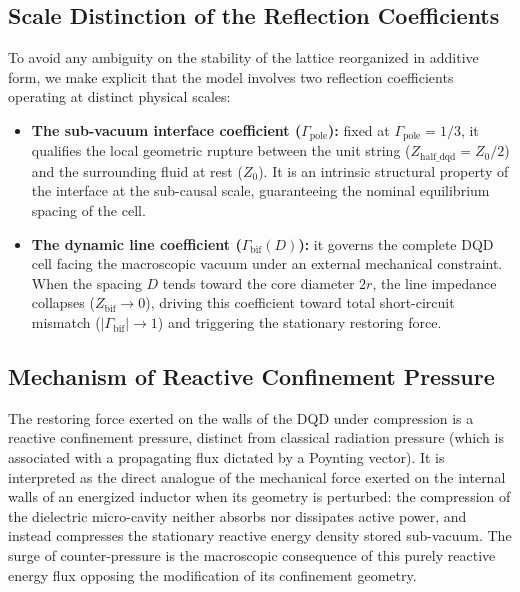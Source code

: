 \documentclass[11pt,a4paper]{article}
\theoremstyle{plain}
\theoremstyle{remark}
\begin{document}
\subsection{Scale Distinction of the Reflection Coefficients}
To avoid any ambiguity on the stability of the lattice reorganized in additive form, we make explicit that the model involves two reflection coefficients operating at distinct physical scales:
\begin{itemize}
    \item \textbf{The sub-vacuum interface coefficient ($\Gamma_{\text{pole}}$):} fixed at $\Gamma_{\text{pole}} = 1/3$, it qualifies the local geometric rupture between the unit string ($Z_{\text{half\_dqd}} = Z_{0}/2$) and the surrounding fluid at rest ($Z_{0}$). It is an intrinsic structural property of the interface at the sub-causal scale, guaranteeing the nominal equilibrium spacing of the cell.
    \item \textbf{The dynamic line coefficient ($\Gamma_{\text{bif}}(D)$):} it governs the complete DQD cell facing the macroscopic vacuum under an external mechanical constraint. When the spacing $D$ tends toward the core diameter $2r$, the line impedance collapses ($Z_{\text{bif}} \rightarrow 0$), driving this coefficient toward total short-circuit mismatch ($|\Gamma_{\text{bif}}| \rightarrow 1$) and triggering the stationary restoring force.
\end{itemize}

\subsection{Mechanism of Reactive Confinement Pressure}
The restoring force exerted on the walls of the DQD under compression is a reactive confinement pressure, distinct from classical radiation pressure (which is associated with a propagating flux dictated by a Poynting vector). It is interpreted as the direct analogue of the mechanical force exerted on the internal walls of an energized inductor when its geometry is perturbed: the compression of the dielectric micro-cavity neither absorbs nor dissipates active power, and instead compresses the stationary reactive energy density stored sub-vacuum. The surge of counter-pressure is the macroscopic consequence of this purely reactive energy flux opposing the modification of its confinement geometry.
\end{document}

